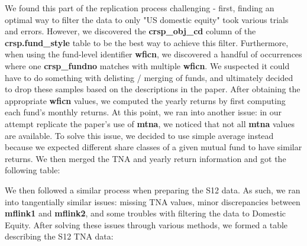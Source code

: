\documentclass{article}
\begin{document}
We found this part of the replication process challenging - first, finding an optimal way to filter the data
 to only "US domestic equity" took various trials and errors. However, we discovered the \textbf{crsp\_obj\_cd} column 
 of the \textbf{crsp.fund\_style} table to be the best way to achieve this filter. Furthermore,
  when using the fund-level identifier \textbf{wficn}, we discovered a handful of occurrences where 
  one \textbf{crsp\_fundno} matches with multiple \textbf{wficn}. We suspected it could have to do 
  something with delisting / merging of funds, and ultimately decided to drop these samples 
  based on the descriptions in the paper. After obtaining the appropriate \textbf{wficn} values,
   we computed the yearly returns by first computing each fund's monthly returns. At this point, we 
   ran into another issue: in our attempt replicate the paper's use of \textbf{mtna}, we noticed that
    not all \textbf{mtna} values are available. To solve this issue, we decided to use simple
     average instead because we expected different share classes of a given mutual fund to have similar
      returns. We then merged the TNA and yearly return information and got the following table: 

\begin{table}[ht]
\centering

\end{table}

We then followed a similar process when preparing the S12 data. As such, we ran into tangentially similar issues: missing TNA values, minor discrepancies between \textbf{mflink1} and \textbf{mflink2}, and some troubles with filtering the data to Domestic Equity. After solving these issues through various methods, we formed a table describing the S12 TNA data: 
\end{document}

